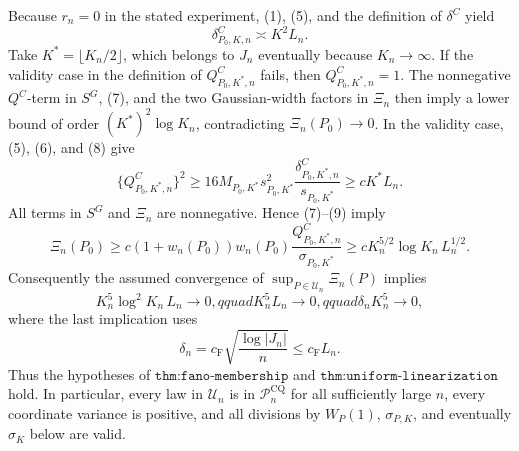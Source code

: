 Because \(r_n=0\) in the stated experiment, (1), (5), and the definition of \(\delta^C\) yield
\[
 \delta^C_{P_0,K,n}\asymp K^2L_n.
 \tag{8}
\]
Take \(K^*=\lfloor K_n/2\rfloor\), which belongs to \(J_n\) eventually because \(K_n\to\infty\).  If the validity case in the definition of \(Q^C_{P_0,K^*,n}\) fails, then \(Q^C_{P_0,K^*,n}=1\).  The nonnegative \(Q^C\)-term in \(S^G\), (7), and the two Gaussian-width factors in \(\Xi_n\) then imply a lower bound of order \((K^*)^2\log K_n\), contradicting \(\Xi_n(P_0)\to0\).  In the validity case, (5), (6), and (8) give
\[
 \{Q^C_{P_0,K^*,n}\}^2
 \geq16M_{P_0,K^*}s_{P_0,K^*}^2
 \frac{\delta^C_{P_0,K^*,n}}{s_{P_0,K^*}}
 \geq cK^*L_n.
 \tag{9}
\]
All terms in \(S^G\) and \(\Xi_n\) are nonnegative.  Hence (7)--(9) imply
\[
 \Xi_n(P_0)
 \geq c(1+w_n(P_0))w_n(P_0)
 \frac{Q^C_{P_0,K^*,n}}{\sigma_{P_0,K^*}}
 \geq cK_n^{5/2}\log K_n\,L_n^{1/2}.
 \tag{10}
\]
Consequently the assumed convergence of \(\sup_{P\in\mathcal U_n}\Xi_n(P)\) implies
\[
 K_n^5\log^2K_n\,L_n\longrightarrow0,qquad
 K_n^5L_n\longrightarrow0,qquad
 \delta_nK_n^5\longrightarrow0,
 \tag{11}
\]
where the last implication uses
\[
 \delta_n=c_{\mathrm F}\sqrt{\frac{\log|J_n|}{n}}
 \leq c_{\mathrm F}L_n.
\]
Thus the hypotheses of \(\texttt{thm:fano-membership}\) and \(\texttt{thm:uniform-linearization}\) hold.  In particular, every law in \(\mathcal U_n\) is in \(\mathcal P_n^{\mathrm{CQ}}\) for all sufficiently large \(n\), every coordinate variance is positive, and all divisions by \(W_P(1)\), \(\sigma_{P,K}\), and eventually \(\widehat\sigma_K\) below are valid.

